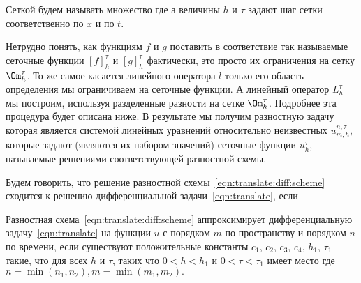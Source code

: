 \documentclass[a4paper]{article}
\begin{document}
\begin{df}
Сеткой будем называть множество  где  а величины $h$ и $\tau$ задают шаг сетки
соответственно по $x$ и по $t$.
\end{df}
Нетрудно понять, как функциям $f$ и $g$ поставить в соответствие так
называемые сеточные функции $[f]_h^{\tau}$ и $[g]_h^{\tau}$
фактически, это просто их ограничения на сетку $\Om_h^{\tau}$. То же
самое касается линейного оператора $l$ только его область определения
мы ограничиваем на сеточные функции. А линейный оператор $L_h^{\tau}$
мы построим, используя разделенные разности на сетке
$\Om_h^{\tau}$. Подробнее эта процедура будет описана ниже. В
результате мы получим разностную задачу
 которая является системой линейных уравнений относительно
неизвестных $u_{m,h}^{n,\tau}$, которые задают (являются их набором
значений) сеточные функции $u_h^{\tau}$, называемые решениями
соответствующей разностной схемы.
\begin{df}
Будем говорить, что решение разностной
схемы~\eqref{eqn:translate:diff:scheme} сходится к решению
дифференциальной задачи~\eqref{eqn:translate}, если
\end{df}
\begin{df}
Разностная схема~\eqref{eqn:translate:diff:scheme} аппроксимирует
дифференциальную задачу~\eqref{eqn:translate} на функции $u$ с
порядком $m$ по пространству и порядком $n$ по времени, если
существуют положительные константы $c_1$, $c_2$, $c_3$, $c_4$, $h_1$,
$\tau_1$ такие, что для всех $h$ и $\tau$, таких что $0<h<h_1$ и
$0<\tau<\tau_1$ имеет место  где $n=\min(n_1, n_2), m=\min(m_1, m_2).$
\end{df}
\end{document}
